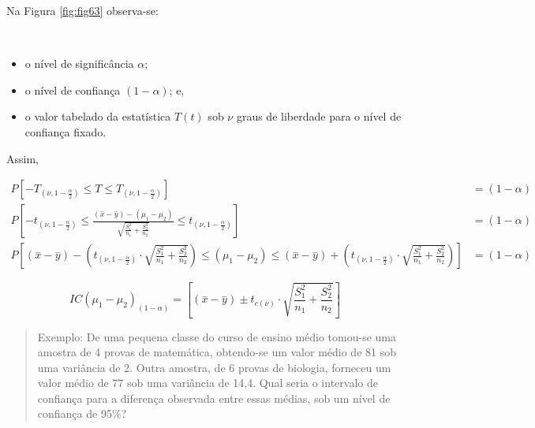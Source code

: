 \documentclass[
]{book}
\providecommand{\tightlist}{%
  \setlength{\itemsep}{0pt}\setlength{\parskip}{0pt}}
\begin{document}
\hfill\break

Na Figura \ref{fig:fig63} observa-se:

~

\begin{itemize}
\tightlist
\item
  o nível de significância \(\alpha\);\\
\item
  o nível de confiança \((1-\alpha)\); e,\\
\item
  o valor tabelado da estatística \(T(t)\) sob \(\nu\) graus de liberdade para o nível de confiança fixado.
\end{itemize}

\hfill\break

Assim,

\hfill\break

\begin{align*}
P\left[-{T}_{(\nu, 1-\frac{\alpha }{2})}\le T \le {T}_{( \nu, 1-\frac{\alpha }{2})}\right] & = (1-\alpha) \\
P\left[-{t}_{( \nu, 1-\frac{\alpha }{2})}\le \frac{   (\stackrel{-}{x}-\stackrel{-}{y})   - (\mu_{1}-\mu_{2})}{\sqrt{\frac{S^{2}_{1}}{n_{1}} + \frac{S^{2}_{2}}{n_{2}} }      } \le {t}_{( \nu, 1-\frac{\alpha }{2})}\right] & = (1-\alpha) \\
P[(\stackrel{-}{x}-\stackrel{-}{y} ) -   ({t}_{( \nu, 1-\frac{\alpha }{2})} \cdot   \sqrt{\frac{S^{2}_{1}}{n_{1}} + \frac{S^{2}_{2}}{n_{2}} }  ) \le (\mu_{1}-\mu_{2}) \le (\stackrel{-}{x}-\stackrel{-}{y})   +({t}_{( \nu, 1-\frac{\alpha }{2})} \cdot  \sqrt{\frac{S^{2}_{1}}{n_{1}} + \frac{S^{2}_{2}}{n_{2}} }        )     ] & = (1-\alpha) 
\end{align*}

\hfill\break

\[
IC(\mu_{1}-\mu_{2})_{(1-\alpha)} = [(\stackrel{-}{x}-\stackrel{-}{y} ) \pm {t}_{c (\nu)} \cdot   \sqrt{\frac{S^{2}_{1}}{n_{1}} + \frac{S^{2}_{2}}{n_{2}} }  ]
\]

\hfill\break

\begin{quote}
Exemplo: De uma pequena classe do curso de ensino médio tomou-se uma amostra de 4 provas de matemática, obtendo-se um valor médio de 81 sob uma variância de 2. Outra amostra, de 6 provas de biologia, forneceu um valor médio de 77 sob uma variância de 14,4. Qual seria o intervalo de confiança para a diferença observada entre essas médias, sob um nível de confiança de 95\%?
\end{quote}
\end{document}
